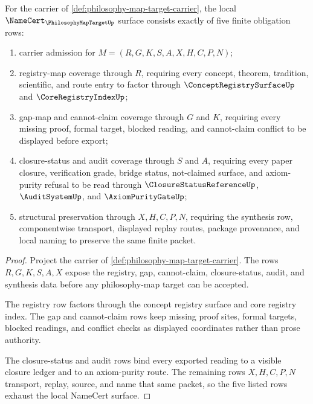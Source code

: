 \begin{theorem}
\label{thm:philosophy-map-target-namecert-obligations}
For the carrier of \autoref{def:philosophy-map-target-carrier}, the local $\NameCert_{\PhilosophyMapTargetUp}$ surface consists exactly of five finite obligation rows:
\begin{enumerate}
\item carrier admission for $M=(R,G,K,S,A,X,H,C,P,N)$;
\item registry-map coverage through $R$, requiring every concept, theorem, tradition, scientific, and route entry to factor through $\ConceptRegistrySurfaceUp$ and $\CoreRegistryIndexUp$;
\item gap-map and cannot-claim coverage through $G$ and $K$, requiring every missing proof, formal target, blocked reading, and cannot-claim conflict to be displayed before export;
\item closure-status and audit coverage through $S$ and $A$, requiring every paper closure, verification grade, bridge status, not-claimed surface, and axiom-purity refusal to be read through $\ClosureStatusReferenceUp$, $\AuditSystemUp$, and $\AxiomPurityGateUp$;
\item structural preservation through $X,H,C,P,N$, requiring the synthesis row, componentwise transport, displayed replay routes, package provenance, and local naming to preserve the same finite packet.
\end{enumerate}
\end{theorem}
\begin{proof}
Project the carrier of \autoref{def:philosophy-map-target-carrier}. The rows $R,G,K,S,A,X$ expose the registry, gap, cannot-claim, closure-status, audit, and synthesis data before any philosophy-map target can be accepted.

The registry row factors through the concept registry surface and core registry index. The gap and cannot-claim rows keep missing proof sites, formal targets, blocked readings, and conflict checks as displayed coordinates rather than prose authority.

The closure-status and audit rows bind every exported reading to a visible closure ledger and to an axiom-purity route. The remaining rows $X,H,C,P,N$ transport, replay, source, and name that same packet, so the five listed rows exhaust the local NameCert surface.
\end{proof}

